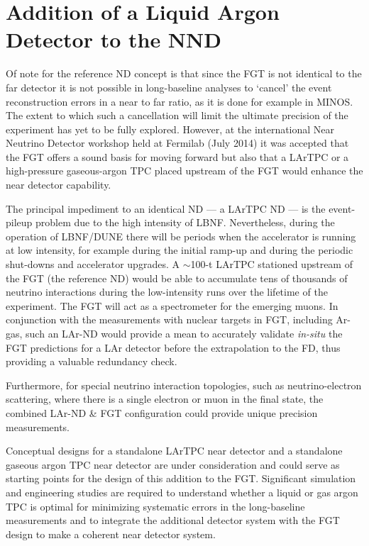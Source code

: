 \section{Addition of a Liquid Argon Detector to the NND}
\label{sec:detectors-nd-alt}

Of note for the reference ND concept is that since the FGT is not
identical to the far detector it is not possible in long-baseline
analyses to `cancel' the event reconstruction errors in a near to far
ratio, as it is done for example in MINOS.  The extent to which such a
cancellation will limit the ultimate precision of the experiment has
yet to be fully explored.  However, at the international Near Neutrino
Detector workshop held at Fermilab (July 2014) it was accepted that
the FGT offers a sound basis for moving forward but also that a LArTPC
or a high-pressure gaseous-argon TPC placed upstream of the FGT would
enhance the near detector capability.


The principal impediment to an
identical ND --- a LArTPC ND --- is the event-pileup problem
due to the high intensity of LBNF. Nevertheless, during the operation
of LBNF/DUNE there will be periods when the accelerator is running at
low intensity, for example during the initial ramp-up and during the
periodic shut-downs and accelerator upgrades. A $\sim$100-t LArTPC
stationed upstream of the FGT (the reference ND) would be able to
accumulate tens of thousands of neutrino interactions during the
low-intensity runs over the lifetime of the experiment.  The FGT will
act as a spectrometer for the emerging muons. In conjunction with the
measurements with nuclear targets in FGT, including Ar-gas, such an
LAr-ND would provide a mean to accurately validate {\em in-situ} the
FGT predictions for a LAr detector before the extrapolation to the FD,
thus providing a valuable redundancy check.

Furthermore, for special neutrino interaction topologies, such as
neutrino-electron scattering, where there is a single electron or muon
in the final state, the combined LAr-ND \& FGT configuration could
provide unique precision measurements.

Conceptual designs for a standalone LArTPC near detector and a
standalone gaseous argon TPC near detector are under consideration and
could serve as starting points for the design of this addition to the
FGT.  Significant simulation and engineering studies are required to
understand whether a liquid or gas argon TPC is optimal for minimizing
systematic errors in the long-baseline measurements and to integrate
the additional detector system with the FGT design to make a coherent
near detector system.

